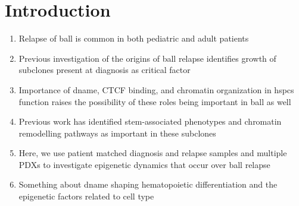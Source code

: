 \section{Introduction}

\begin{enumerate}
  \item Relapse of \gls{ball} is common in both pediatric and adult patients
  \item Previous investigation of the origins of \gls{ball} relapse identifies growth of subclones present at diagnosis as critical factor
  \item Importance of \gls{dname}, CTCF binding, and chromatin organization in \glspl{hspc} function raises the possibility of these roles being important in \gls{ball} as well
  \item Previous work has identified stem-associated phenotypes and chromatin remodelling pathways as important in these subclones
  \item Here, we use patient matched diagnosis and relapse samples and multiple PDXs to investigate epigenetic dynamics that occur over \gls{ball} relapse
  \item Something about \gls{dname} shaping hematopoietic differentiation and the epigenetic factors related to cell type \cite{izzoDNAMethylationDisruption2020,takayamaTransitionQuiescentActivated2021}
\end{enumerate}
